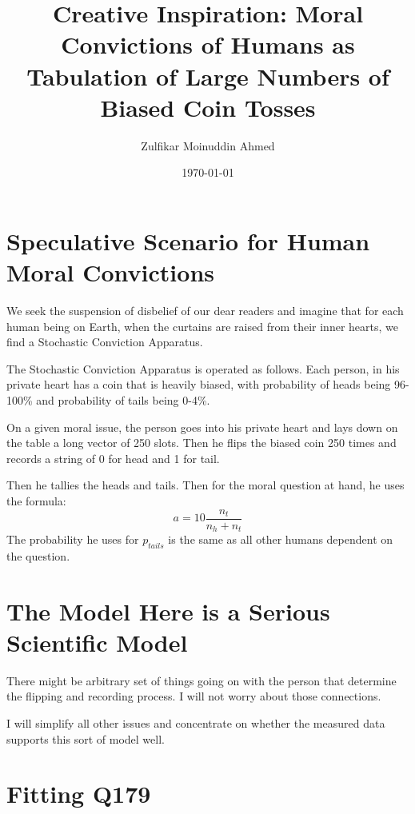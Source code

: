 \documentclass{amsart}
\title{Creative Inspiration: Moral Convictions of Humans as Tabulation of Large Numbers of Biased Coin Tosses}
\author{Zulfikar Moinuddin Ahmed}
\date{\today}
\begin{document}
\maketitle

\section{Speculative Scenario for Human Moral Convictions}


We seek the suspension of disbelief of our dear readers and imagine that for each human being on Earth, when the curtains are raised from their inner hearts, we find a Stochastic Conviction Apparatus.

The Stochastic Conviction Apparatus is operated as follows.  Each person, in his private heart has a coin that is heavily biased, with probability of heads being 96-100\% and probability of tails being 0-4\%.

On a given moral issue, the person goes into his private heart and lays down on the table a long vector of 250 slots.  Then he flips the biased coin 250 times and records a string of 0 for head and 1 for tail.

Then he tallies the heads and tails.  Then for the moral question at hand, he uses the formula:
\[
a = 10 \frac{n_t}{n_h + n_t} 
\]
The probability he uses for $p_{tails}$ is the same as all other humans dependent on the question.

\section{The Model Here is a Serious Scientific Model}

There might be arbitrary set of things going on with the person that determine the flipping and recording process.  I will not worry about those connections.  

I will simplify all other issues and concentrate on whether the measured data supports this sort of model well.

\section{Fitting Q179}
\end{document}

